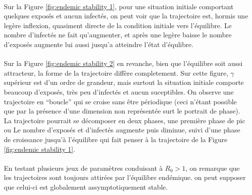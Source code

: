 \documentclass[11pt]{article}
\begin{document}
\paragraph{}
 Sur la Figure \ref{fig:endemic stability 1}, pour une situation initiale comportant quelques expos\'es et aucun infect\'es, on peut voir que la trajectoire est, hormis une leg\`ere inflexion, quasiment directe de la condition initiale vers l'\'equilibre. Le nombre d'infect\'es ne fait qu'augmenter, et apr\`es une leg\`ere baisse le nombre d'expos\'es augmente lui aussi jusqu'a atteindre l'\'etat d'\'equlibre.

\paragraph{}
Sur la Figure \ref{fig:endemic stability 2} en revanche, bien que l'\'equilibre soit aussi attracteur, la forme de la trajectoire diff\`ere completement. Sur cette figure, $\gamma$ sup\'erieur est d'un ordre de grandeur, mais surtout la situation initiale comporte beaucoup d'expos\'es, tr\`es peu d'infect\'es et aucun suceptibles. On observe une trajectoire en ``boucle'' qui se croise sans \^etre p\'eriodique (ceci n'\'etant possible que par la pr\'esence d'une dimension non repr\'esent\'ee surt le portrait de phase). La trajectoire pourrait se d\'ecomposer en deux phases, une premi\`ere phase de pic ou Le nombre d'expos\'es et d'infect\'es augmente puis diminue, suivi d'une phase de croissance jusqu'\`a l'\'equilibre qui fait penser \`a la trajectoire de la Figure \ref{fig:endemic stability 1}.

\paragraph{}
En testant plusieurs jeux de param\`etres conduisant \`a $R_0 >1$, on remarque que les trajectoires sont toujours attir\'ees par l'\'equilibre end\'emique. on peut supposer que celui-ci est globalement assymptotiquement stable.
\end{document}
